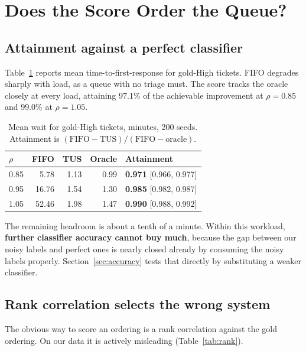 \section{Does the Score Order the Queue?}
\label{sec:ordering}

\subsection{Attainment against a perfect classifier}

Table~\ref{tab:attain} reports mean time-to-first-response for gold-High
tickets. FIFO degrades sharply with load, as a queue with no triage must. The
score tracks the oracle closely at every load, attaining 97.1\% of the achievable
improvement at $\rho = 0.85$ and 99.0\% at $\rho = 1.05$.

\begin{table}[!tb]
\caption{Mean wait for gold-High tickets, minutes, 200 seeds. Attainment is
$(\mathrm{FIFO}-\mathrm{TUS})/(\mathrm{FIFO}-\mathrm{oracle})$.}
\label{tab:attain}
\centering
\small
\begin{tabular}{@{}lrrrl@{}}
\toprule
$\rho$ & FIFO & TUS & Oracle & Attainment \\
\midrule
0.85 & 5.78  & 1.13 & 0.99 & \textbf{0.971} [0.966, 0.977] \\
0.95 & 16.76 & 1.54 & 1.30 & \textbf{0.985} [0.982, 0.987] \\
1.05 & 52.46 & 1.98 & 1.47 & \textbf{0.990} [0.988, 0.992] \\
\bottomrule
\end{tabular}
\end{table}

The remaining headroom is about a tenth of a minute. Within this workload,
\textbf{further classifier accuracy cannot buy much}, because the gap between our
noisy labels and perfect ones is nearly closed already by consuming the noisy
labels properly. Section~\ref{sec:accuracy} tests that directly by substituting a
weaker classifier.

\subsection{Rank correlation selects the wrong system}

The obvious way to score an ordering is a rank correlation against the gold
ordering. On our data it is actively misleading (Table~\ref{tab:rank}).

